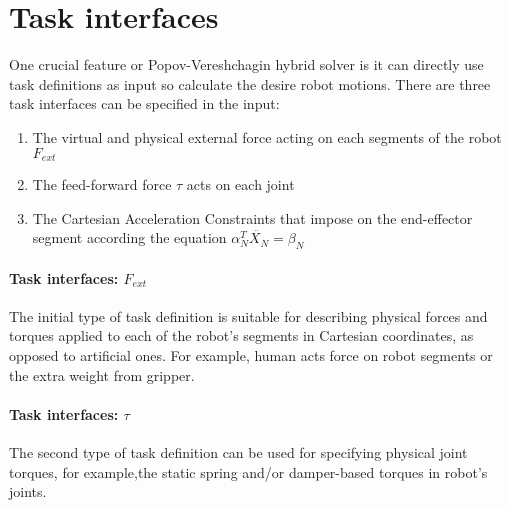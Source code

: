 \documentclass[report.tex]{subfiles}
\begin{document}
    \section{Task interfaces} \label{Task interfaces}
    One crucial feature or Popov-Vereshchagin hybrid solver is it can directly use task definitions as input so calculate the desire robot motions. There are three task interfaces can be specified in the input:
    \begin{enumerate}
        \item The virtual and physical external force acting on each segments of the robot $F_{ext}$
        \item The feed-forward force $\tau$ acts on each joint 
        \item The Cartesian Acceleration Constraints that impose on the end-effector segment according the equation $\alpha_N^T \ddot{X_N} = \beta_N$
    \end{enumerate}
    \paragraph*{\large{Task interfaces: $F_{ext}$ }\\} The initial type of task definition is suitable for describing physical forces and torques applied to each of the robot's segments in Cartesian coordinates, as opposed to artificial ones. For example, human acts force on robot segments or the extra weight from gripper.
    \paragraph*{\large{Task interfaces: $\tau$}\\} The second type of task definition can be used for specifying physical joint torques, for example,the static spring and/or damper-based torques in robot's joints.
\end{document}
